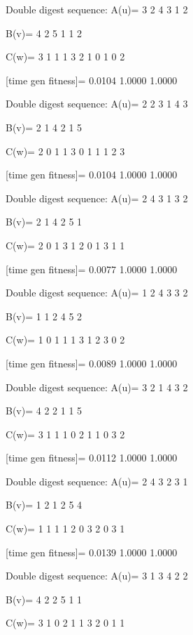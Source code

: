 Double digest sequence:
A(u)=
     3     2     4     3     1     2

B(v)=
     4     2     5     1     1     2

C(w)=
     3     1     1     1     3     2     1     0     1     0     2

[time gen fitness]=
    0.0104    1.0000    1.0000

Double digest sequence:
A(u)=
     2     2     3     1     4     3

B(v)=
     2     1     4     2     1     5

C(w)=
     2     0     1     1     3     0     1     1     1     2     3

[time gen fitness]=
    0.0104    1.0000    1.0000

Double digest sequence:
A(u)=
     2     4     3     1     3     2

B(v)=
     2     1     4     2     5     1

C(w)=
     2     0     1     3     1     2     0     1     3     1     1

[time gen fitness]=
    0.0077    1.0000    1.0000

Double digest sequence:
A(u)=
     1     2     4     3     3     2

B(v)=
     1     1     2     4     5     2

C(w)=
     1     0     1     1     1     3     1     2     3     0     2

[time gen fitness]=
    0.0089    1.0000    1.0000

Double digest sequence:
A(u)=
     3     2     1     4     3     2

B(v)=
     4     2     2     1     1     5

C(w)=
     3     1     1     1     0     2     1     1     0     3     2

[time gen fitness]=
    0.0112    1.0000    1.0000

Double digest sequence:
A(u)=
     2     4     3     2     3     1

B(v)=
     1     2     1     2     5     4

C(w)=
     1     1     1     1     2     0     3     2     0     3     1

[time gen fitness]=
    0.0139    1.0000    1.0000

Double digest sequence:
A(u)=
     3     1     3     4     2     2

B(v)=
     4     2     2     5     1     1

C(w)=
     3     1     0     2     1     1     3     2     0     1     1

